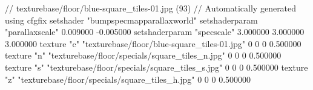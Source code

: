 // texturebase/floor/blue-square_tiles-01.jpg (93)
// Automatically generated using cfgfix
setshader "bumpspecmapparallaxworld"
setshaderparam "parallaxscale" 0.009000 -0.005000
setshaderparam "specscale" 3.000000 3.000000 3.000000
texture "c" "texturebase/floor/blue-square_tiles-01.jpg" 0 0 0 0.500000
texture "n" "texturebase/floor/specials/square_tiles_n.jpg" 0 0 0 0.500000
texture "s" "texturebase/floor/specials/square_tiles_s.jpg" 0 0 0 0.500000
texture "z" "texturebase/floor/specials/square_tiles_h.jpg" 0 0 0 0.500000

